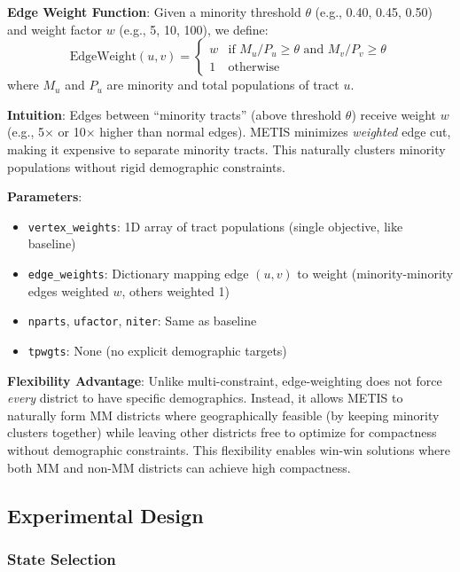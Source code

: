 \textbf{Edge Weight Function}: Given a minority threshold $\theta$ (e.g., 0.40, 0.45, 0.50) and weight factor $w$ (e.g., 5, 10, 100), we define:
\[
\text{EdgeWeight}(u, v) = \begin{cases}
w & \text{if } M_u / P_u \geq \theta \text{ and } M_v / P_v \geq \theta \\
1 & \text{otherwise}
\end{cases}
\]
where $M_u$ and $P_u$ are minority and total populations of tract $u$.

\textbf{Intuition}: Edges between ``minority tracts'' (above threshold $\theta$) receive weight $w$ (e.g., 5× or 10× higher than normal edges). METIS minimizes \emph{weighted} edge cut, making it expensive to separate minority tracts. This naturally clusters minority populations without rigid demographic constraints.

\textbf{Parameters}:
\begin{itemize}
    \item \texttt{vertex\_weights}: 1D array of tract populations (single objective, like baseline)
    \item \texttt{edge\_weights}: Dictionary mapping edge $(u,v)$ to weight (minority-minority edges weighted $w$, others weighted 1)
    \item \texttt{nparts}, \texttt{ufactor}, \texttt{niter}: Same as baseline
    \item \texttt{tpwgts}: None (no explicit demographic targets)
\end{itemize}

\textbf{Flexibility Advantage}: Unlike multi-constraint, edge-weighting does not force \emph{every} district to have specific demographics. Instead, it allows METIS to naturally form MM districts where geographically feasible (by keeping minority clusters together) while leaving other districts free to optimize for compactness without demographic constraints. This flexibility enables win-win solutions where both MM and non-MM districts can achieve high compactness.

\subsection{Experimental Design}

\subsubsection{State Selection}

